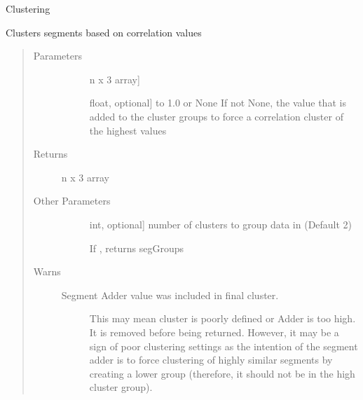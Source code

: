 \documentclass[letterpaper,10pt,english]{sphinxmanual}
\begin{document}
\begin{fulllineitems}
\label{\detokenize{generated/seg1d.algorithm.cluster:seg1d.algorithm.cluster}}
\sphinxAtStartPar
Clustering

\sphinxAtStartPar
Clusters segments based on correlation values
\begin{quote}\begin{description}
\item[{Parameters}] \leavevmode\begin{description}
\item[{}] \leavevmode{[}n x 3 array{]}
\sphinxAtStartPar
{}

\item[{}] \leavevmode{[}float, optional{]}
 to 1.0 or None
If not None, the value that is added to the cluster groups to force
a correlation cluster of the highest values

\end{description}

\item[{Returns}] \leavevmode\begin{description}
\item[{n x 3 array}] \leavevmode
\sphinxAtStartPar
{}

\end{description}

\item[{Other Parameters}] \leavevmode\begin{description}
\item[{}] \leavevmode{[}int, optional{]}
\sphinxAtStartPar
number of clusters to group data in (Default 2)

\sphinxAtStartPar
If , returns segGroups

\end{description}

\item[{Warns}] \leavevmode\begin{description}
\item[{Segment Adder value was included in final cluster.}] \leavevmode
\sphinxAtStartPar
This may mean cluster is poorly defined or Adder is too high.
It is removed before being returned. However, it may be a sign of
poor clustering settings as the intention of the segment adder is to
force clustering of highly similar segments by creating a lower group
(therefore, it should not be in the high cluster group).


\end{description}
\end{description}
\end{quote}
\end{fulllineitems}
\end{document}
